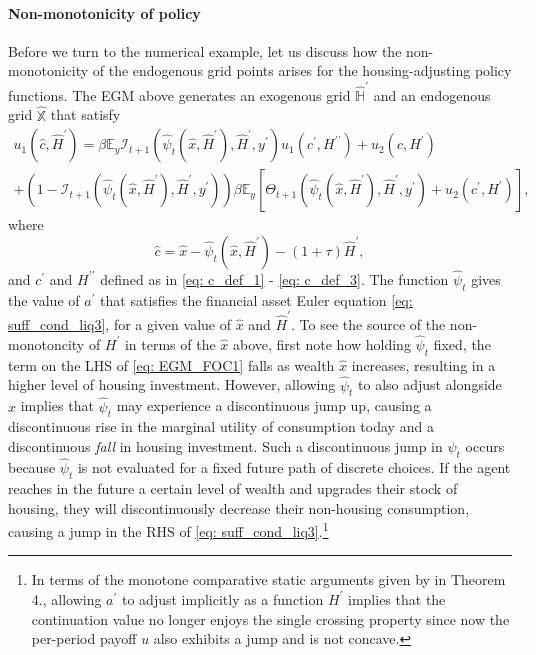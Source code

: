 \documentclass[12pt]{article}
\begin{document}
\paragraph{Non-monotonicity of policy} Before we turn to the numerical example, let us discuss how the non-monotonicity of the endogenous grid points arises for the housing-adjusting policy functions. The EGM above generates an exogenous grid $\hat{\mathbb{H}}^{\prime}$ and an endogenous grid $\hat{\mathbb{X}}$ that satisfy
%
\begin{multline}\label{eq: EGM_FOC1}
u_{1}(\hat{c},\hat{H}^{\prime}) =  \beta \mathbb{E}_{y}\mathcal{I}_{t+1}( \hat{\psi}_{t}(\hat{x},\hat{H}^{\prime}) , \hat{H}^{\prime}, y^{\prime})u_{1}(c^{\prime}, H^{\prime\prime}) + u_{2}(c, H^{\prime}) \\ + (1-\mathcal{I}_{t+1}(\hat{\psi}_{t}(\hat{x},\hat{H}^{\prime}), \hat{H}^{\prime}, y^{\prime}))\beta\mathbb{E}_{y}\left[\Theta_{t+1}( \hat{\psi}_{t}(\hat{x},\hat{H}^{\prime}) , \hat{H}^{\prime}, y^{\prime}) + u_{2}(c^{\prime}, H^{\prime})\right],
\end{multline}
%
where
\begin{equation}
\hat{c} = \hat{x} - \hat{\psi}_{t}(\hat{x},\hat{H}^{\prime}) - (1+\tau)\hat{H}^{\prime},
\end{equation}
%
and $c^{\prime}$ and $H^{\prime\prime}$ defined as in \eqref{eq: c_def_1} - \eqref{eq: c_def_3}. The function $\hat{\psi}_{t}$ gives the value of $a^{\prime}$ that satisfies the financial asset Euler equation \eqref{eq: suff_cond_liq3}, for a given value of $\hat{x}$ and $\hat{H}^{\prime}$. To see the source of the non-monotoncity of $H^{\prime}$ in terms of the $\hat{x}$  above, first note how holding $\hat{\psi}_{t}$ fixed, the term on the LHS of \eqref{eq: EGM_FOC1} falls as wealth $\hat{x}$ increases, resulting in a higher level of housing investment. However, allowing $\hat{\psi}_{t}$ to also adjust alongside $\hat{x}$ implies that $\hat{\psi}_{t}$ may experience a discontinuous jump up, causing a discontinuous rise in the marginal utility of consumption today and a discontinuous \textit{fall} in housing investment. Such a discontinuous jump in $\hat{\psi}_{t}$ occurs because $\hat{\psi}_{t}$ is not evaluated for a fixed future path of discrete choices. If the agent reaches in the future a certain level of wealth and upgrades their stock of housing, they will discontinuously decrease their non-housing consumption, causing a jump in the RHS of \eqref{eq: suff_cond_liq3}.\footnote{In terms of the monotone comparative static arguments given by \cite{Iskhakov2017} in Theorem 4., allowing $a^{\prime}$ to adjust implicitly as a function $H^{\prime}$ implies that the continuation value no longer enjoys the single crossing property since now the per-period payoff $u$ also exhibits a jump and is not concave.}
\end{document}
